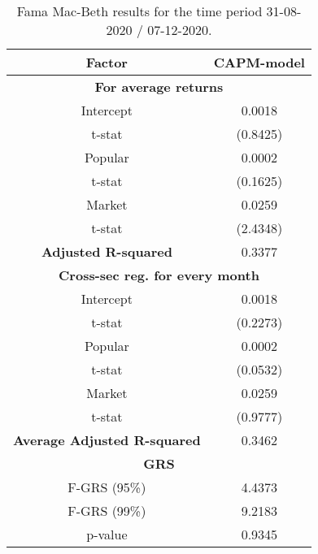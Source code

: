 \begin{table}[h!]
	\centering
	\captionsetup{skip=0.5\baselineskip}
	\caption{Fama Mac-Beth results for the time period 31-08-2020 / 07-12-2020.}
	\begin{tabular}{|c|c|}
		\hline
		\textbf{Factor} & \textbf{CAPM-model} \\ \hline
		\multicolumn{2}{|c|}{\textbf{For average returns}} \\ \hline
		Intercept & 0.0018 \\ 
		t-stat & (0.8425) \\ \hline
		Popular & 0.0002 \\ 
		t-stat & (0.1625)\\ \hline
		Market & 0.0259 \\
		t-stat & (2.4348)\\ \hline
		\textbf{Adjusted R-squared} & 0.3377 \\ \hline
		\multicolumn{2}{|c|}{\textbf{Cross-sec reg. for every month}} \\ \hline
		Intercept & 0.0018 \\ 
		t-stat & (0.2273) \\ \hline
		Popular & 0.0002 \\ 
		t-stat & (0.0532)\\ \hline
		Market & 0.0259 \\
		t-stat & (0.9777)\\ \hline
		\textbf{Average Adjusted R-squared} & 0.3462 \\ \hline
		\multicolumn{2}{|c|}{\textbf{GRS}} \\ \hline
		F-GRS (95\%) & 4.4373 \\ \hline
		F-GRS (99\%) & 9.2183 \\ \hline
		p-value & 0.9345 \\ \hline
	\end{tabular}
\end{table}

